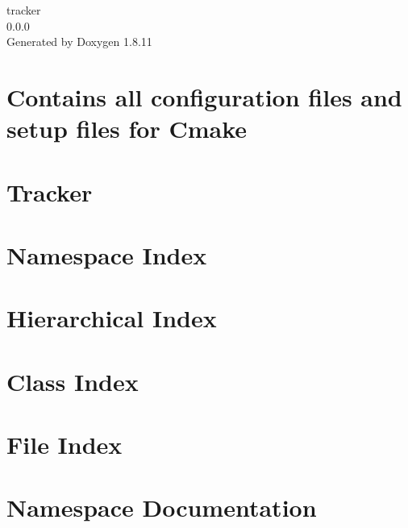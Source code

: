 \documentclass[twoside]{book}
\newcommand{\+}{\discretionary{\mbox{\scriptsize$\hookleftarrow$}}{}{}}
\newcommand{\clearemptydoublepage}{%
  \newpage{\pagestyle{empty}\cleardoublepage}%
}
\begin{document}
\hypersetup{pageanchor=false,
             bookmarksnumbered=true,
             pdfencoding=unicode
            }
\begin{titlepage}
\vspace*{7cm}
\begin{center}%
{\Large tracker \\[1ex]\large 0.\+0.\+0 }\\
\vspace*{1cm}
{\large Generated by Doxygen 1.8.11}\\
\end{center}
\end{titlepage}
\clearemptydoublepage
\tableofcontents
\clearemptydoublepage
{}
\hypersetup{pageanchor=true}

\chapter{Contains all configuration files and setup files for Cmake}
\label{md__home_travis_build_ManuelMeraz_Tracker_cmake_README}
\hypertarget{md__home_travis_build_ManuelMeraz_Tracker_cmake_README}{}

\chapter{Tracker}
\label{md__home_travis_build_ManuelMeraz_Tracker_README}
\hypertarget{md__home_travis_build_ManuelMeraz_Tracker_README}{}

\chapter{Namespace Index}

\chapter{Hierarchical Index}

\chapter{Class Index}

\chapter{File Index}

\chapter{Namespace Documentation}




\end{document}
